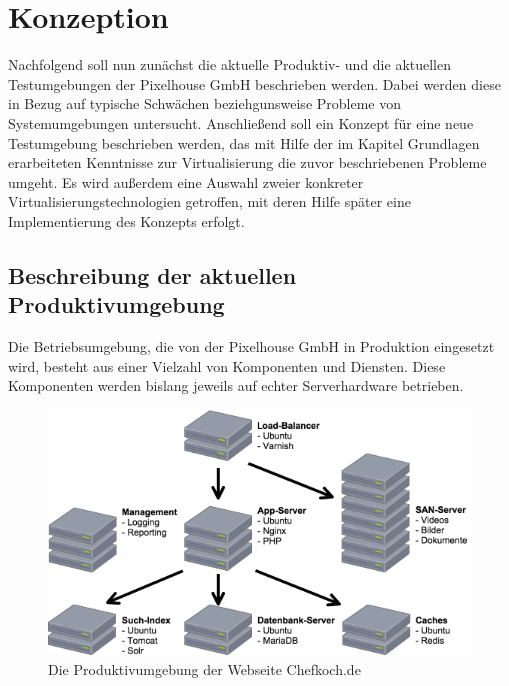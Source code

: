 \section{Konzeption}

Nachfolgend soll nun zunächst die aktuelle Produktiv- und die aktuellen Testumgebungen der Pixelhouse GmbH beschrieben werden. Dabei werden diese in Bezug auf typische Schwächen beziehgunsweise Probleme von Systemumgebungen untersucht. Anschließend soll ein Konzept für eine neue Testumgebung beschrieben werden, das mit Hilfe der im Kapitel Grundlagen erarbeiteten Kenntnisse zur Virtualisierung die zuvor beschriebenen Probleme umgeht. Es wird außerdem eine Auswahl zweier konkreter Virtualisierungstechnologien getroffen, mit deren Hilfe später eine Implementierung des Konzepts erfolgt.

\subsection{Beschreibung der aktuellen Produktivumgebung}

Die Betriebsumgebung, die von der Pixelhouse GmbH in Produktion eingesetzt wird, besteht aus einer Vielzahl von Komponenten und Diensten. Diese Komponenten werden bislang jeweils auf echter Serverhardware betrieben.

\begin{figure}[!ht]
  \begin{center}
    \includegraphics[width=14cm]{bilder/Produktiv-Umgebung.png}
    \caption{Die Produktivumgebung der Webseite Chefkoch.de}
    \label{produktion}
  \end{center}
\end{figure}

